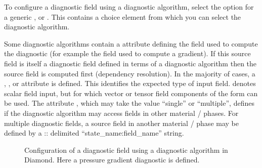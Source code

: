 To configure a diagnostic field using a diagnostic algorithm, select the
 option for a generic , 
or . This contains a 
choice element from which you can select the diagnostic algorithm.

Some diagnostic algorithms contain a 
attribute defining the field used to compute the diagnostic (for example the
field used to compute a gradient). If this source field is itself a diagnostic
field defined in terms of a diagnostic algorithm then the source field is
computed first (dependency resolution).
In the majority of cases, a , , 
or  attribute is defined. This identifies the
expected type of input field.  denotes scalar field
input, but for which vector or tensor field components of the form 
can be used.
The attribute , which may take the
value ``single'' or ``multiple'', defines if the diagnostic algorithm may
access fields in other material / phases. For multiple 
diagnostic fields, a source field in another material / phase
may be defined by a :: delimited ``state\_name\::field\_name'' string.

\begin{figure}[ht]
  \centering
  \caption{Configuration of a diagnostic field using a diagnostic algorithm in
           Diamond. Here a pressure gradient diagnostic is defined.}
  \label{fig:diagnostic_algorithm}
\end{figure}

